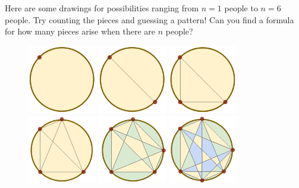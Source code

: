\documentclass[openany, notitlepage, justified]{tufte-book}
\begin{document}
            Here are some drawings for possibilities ranging from $n=1$ people
            to $n=6$ people.  Try counting the pieces and guessing a pattern!
            Can you find a formula for how many pieces arise when there are $n$
            people?
            \begin{figure}[h!]
                \centering
                \includegraphics[height=3cm]{cake-1}
                \includegraphics[height=3cm]{cake-2}
                \includegraphics[height=3cm]{cake-3} \\
                \includegraphics[height=3cm]{cake-4}
                \includegraphics[height=3cm]{cake-5-col}
                \includegraphics[height=3cm]{cake-6-col}

\end{figure}
\end{document}
